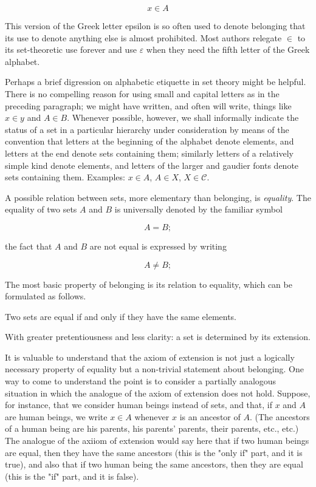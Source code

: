 \begin{equation*}
x \in A
\end{equation*}

This version of the Greek letter epsilon is so often used to denote belonging that its use to denote anything else is almost prohibited. Most authors relegate $\in$ to its set-theoretic use forever and use $\varepsilon$ when they need the fifth letter of the Greek alphabet. 

Perhaps a brief digression on alphabetic etiquette in set theory might be helpful. There is no compelling reason for using small and capital letters as in the preceding paragraph; we might have written, and often will write, things like $x \in y$ and $A \in B$. Whenever possible, however, we shall informally indicate the status of a set in a particular hierarchy under consideration by means of the convention that letters at the beginning of the alphabet denote elements, and letters at the end denote sets containing them; similarly letters of a relatively simple kind denote elements, and letters of the larger and gaudier fonts denote sets containing them. Examples: $x \in A$, $A \in X$, $X \in \mathcal{C}$.


A possible relation between sets, more elementary than belonging, is \textit{equality}. The equality of two sets $A$ and $B$ is universally denoted by the familiar symbol 

\begin{equation*}
A = B;
\end{equation*}

the fact that $A$ and $B$ are not equal is expressed by writing 

\begin{equation*}
A \neq B;
\end{equation*}

The most basic property of belonging is its relation to equality, which can be formulated as follows. 

\begin{named} Two sets are equal if and only if they have the same elements.
\end{named}

With greater pretentiousness and less clarity: a set is determined by its extension. 

It is valuable to understand that the axiom of extension is not just a logically necessary property of equality but a non-trivial statement about belonging. One way to come to understand the point is to consider a partially analogous situation in which the analogue of the axiom of extension does not hold. Suppose, for instance, that we consider human beings instead of sets, and that, if $x$ and $A$ are human beings, we write $x \in A$ whenever $x$ is an ancestor of $A$. (The ancestors of a human being are his parents, his parents' parents, their parents, etc., etc.) The analogue of the axiiom of extension would say here that if two human beings are equal, then they have the same ancestors (this is the "only if" part, and it is true), and also that if two human being the same ancestors, then they are equal (this is the "if" part, and it is false). 

